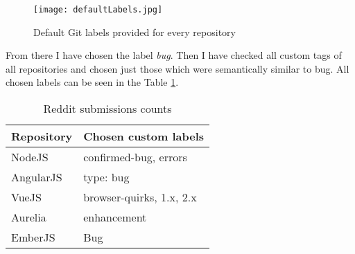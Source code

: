 \begin{figure}[H]%
    \centering
	\texttt{[image: defaultLabels.jpg]}
    \caption{Default Git labels provided for every repository}%
    \label{fig:defaultLabels}%
\end{figure}

From there I have chosen the label \textit{bug}. Then I have checked all custom tags of all repositories and chosen just those which were semantically similar to bug. All chosen labels can be seen in the Table \ref{table:allGitBugLabels}.


\begin{table}[H]
\centering
\begin{tabular}{ |p{3cm}||p{6cm}|}
 \hline
\textbf{ Repository }& \textbf{Chosen custom labels}\\
 \hline
 NodeJS   & confirmed-bug, errors \\ \hline
 AngularJS &   type: bug \\ \hline
 VueJS & browser-quirks, 1.x, 2.x\\ \hline
 Aurelia & enhancement\\ \hline
 EmberJS & Bug\\ \hline
\end{tabular}
\caption{Reddit submissions counts}
\label{table:allGitBugLabels}
\end{table}
